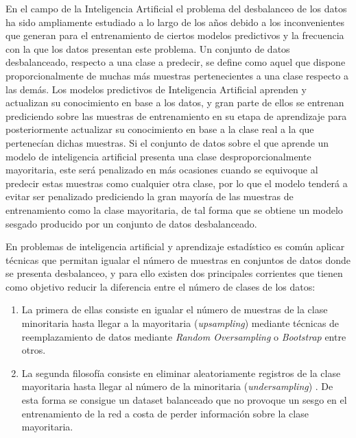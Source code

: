 \documentclass{uathesis-es}
\begin{document}
	
	En el campo de la Inteligencia Artificial el problema del desbalanceo de los datos ha sido ampliamente estudiado a lo largo de los años debido a los inconvenientes que generan para el entrenamiento de ciertos modelos predictivos y la frecuencia con la que los datos presentan este problema. Un conjunto de datos desbalanceado, respecto a una clase a predecir, se define como aquel que dispone proporcionalmente de muchas más muestras pertenecientes a una clase respecto a las demás. Los modelos predictivos de Inteligencia Artificial aprenden y actualizan su conocimiento en base a los datos, y gran parte de ellos se entrenan prediciendo sobre las muestras de entrenamiento en su etapa de aprendizaje para posteriormente actualizar su conocimiento en base a la clase real a la que pertenecían dichas muestras. Si el conjunto de datos sobre el que aprende un modelo de inteligencia artificial presenta una clase desproporcionalmente mayoritaria, este será penalizado en más ocasiones cuando se equivoque al predecir estas muestras como cualquier otra clase, por lo que el modelo tenderá a evitar ser penalizado prediciendo la gran mayoría de las muestras de entrenamiento como la clase mayoritaria, de tal forma que se obtiene un modelo sesgado producido por un conjunto de datos desbalanceado.
	
	En problemas de inteligencia artificial y aprendizaje estadístico es común aplicar técnicas que permitan igualar el número de muestras en conjuntos de datos donde se presenta desbalanceo, y para ello existen dos principales corrientes que tienen como objetivo reducir la diferencia entre el número de clases de los datos:
	
	\begin{enumerate}
		\item La primera de ellas consiste en igualar el número de muestras de la clase minoritaria hasta llegar a la mayoritaria (\textit{upsampling}) mediante técnicas de reemplazamiento de datos mediante \textit{Random Oversampling} \cite{abdi2015combat} o \textit{Bootstrap} \cite{zoubir2007bootstrap} entre otros.
		\item La segunda filosofía consiste en eliminar aleatoriamente registros de la clase mayoritaria hasta llegar al número de la minoritaria (\textit{undersampling}) \cite{mohammed2020machine}. De esta forma se consigue un dataset balanceado que no provoque un sesgo en el entrenamiento de la red a costa de perder información sobre la clase mayoritaria.
	\end{enumerate}
	
\end{document}
